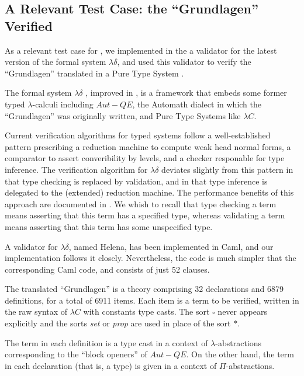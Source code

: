 \subsection{A Relevant Test Case: the ``Grundlagen'' Verified}
\label{grundlagen}

As a relevant test case for \elpi,
we implemented in the \frag{}
a validator for the latest version of the formal system $\lambda\delta$,
and used this validator to verify the
``Grundlagen'' \cite{Jut79} translated in a Pure Type System
\cite{Brn92}.

The formal system $\lambda\delta$ \cite{lambdadeltaJ1},
improved in \cite{lambdadeltaJ2a,lambdadeltaJ3a},
is a framework that embeds
some former typed $\lambda$-calculi including 
$Aut-QE$, the Automath dialect in which the ``Grundlagen'' was
originally written, and Pure Type Systems like $\lambda C$.

Current verification algorithms for typed systems follow
a well-established pattern prescribing a reduction
machine to compute weak head normal forms, a comparator to assert
converibility by levels, and a checker responable for type inference.
The verification algorithm for $\lambda\delta$ 
deviates slightly from this pattern in that
type checking is replaced by validation, and in that
type inference is delegated to the (extended) reduction machine. 
The performance benefits of this approach are documented in
\cite{lambdadeltaJ3a}.
We whish to recall that type checking a term means 
asserting that this term has a specified type, whereas
validating a term means asserting that this term has 
some unspecified type.

A validator for $\lambda\delta$, named Helena,
has been implemented in Caml,
and our \lp{} implementation follows it closely.
Nevertheless, the \lp{} code is much simpler that the
corresponding Caml code, and consists of just 52 clauses.

The translated ``Grundlagen'' is a theory comprising 
32 declarations and 6879 definitions, for a total of 6911 items.
Each item is a term to be verified, written in the raw syntax of
$\lambda C$ with constants type casts. The sort $\square$ never
appears explicitly and the sorts \emph{set} or \emph{prop}
are used in place of the sort $\ast$.

The term in each definition is a type cast in a 
context of $\lambda$-abstractions corresponding to the ``block openers''
of $Aut-QE$.
On the other hand, the term in each declaration (that is, a type) is
given in a context of $\Pi$-abstractions.






